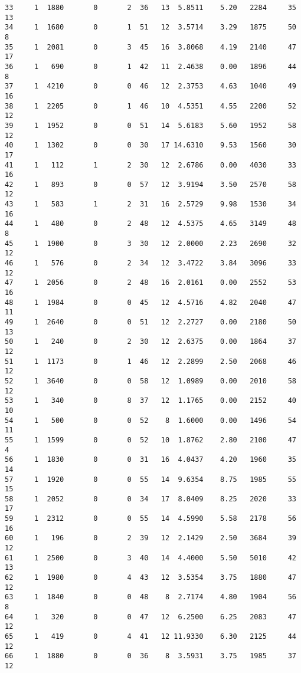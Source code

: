 \documentclass[
  letterpaper,
  DIV=11,
  numbers=noendperiod]{scrreprt}
\begin{document}
\begin{verbatim}
33     1  1880       0       2  36   13  5.8511    5.20   2284     35      13
34     1  1680       0       1  51   12  3.5714    3.29   1875     50       8
35     1  2081       0       3  45   16  3.8068    4.19   2140     47      17
36     1   690       0       1  42   11  2.4638    0.00   1896     44       8
37     1  4210       0       0  46   12  2.3753    4.63   1040     49      16
38     1  2205       0       1  46   10  4.5351    4.55   2200     52      12
39     1  1952       0       0  51   14  5.6183    5.60   1952     58      12
40     1  1302       0       0  30   17 14.6310    9.53   1560     30      17
41     1   112       1       2  30   12  2.6786    0.00   4030     33      16
42     1   893       0       0  57   12  3.9194    3.50   2570     58      12
43     1   583       1       2  31   16  2.5729    9.98   1530     34      16
44     1   480       0       2  48   12  4.5375    4.65   3149     48       8
45     1  1900       0       3  30   12  2.0000    2.23   2690     32      12
46     1   576       0       2  34   12  3.4722    3.84   3096     33      12
47     1  2056       0       2  48   16  2.0161    0.00   2552     53      16
48     1  1984       0       0  45   12  4.5716    4.82   2040     47      11
49     1  2640       0       0  51   12  2.2727    0.00   2180     50      13
50     1   240       0       2  30   12  2.6375    0.00   1864     37      12
51     1  1173       0       1  46   12  2.2899    2.50   2068     46      12
52     1  3640       0       0  58   12  1.0989    0.00   2010     58      12
53     1   340       0       8  37   12  1.1765    0.00   2152     40      10
54     1   500       0       0  52    8  1.6000    0.00   1496     54      11
55     1  1599       0       0  52   10  1.8762    2.80   2100     47       4
56     1  1830       0       0  31   16  4.0437    4.20   1960     35      14
57     1  1920       0       0  55   14  9.6354    8.75   1985     55      15
58     1  2052       0       0  34   17  8.0409    8.25   2020     33      17
59     1  2312       0       0  55   14  4.5990    5.58   2178     56      16
60     1   196       0       2  39   12  2.1429    2.50   3684     39      12
61     1  2500       0       3  40   14  4.4000    5.50   5010     42      13
62     1  1980       0       4  43   12  3.5354    3.75   1880     47      12
63     1  1840       0       0  48    8  2.7174    4.80   1904     56       8
64     1   320       0       0  47   12  6.2500    6.25   2083     47      12
65     1   419       0       4  41   12 11.9330    6.30   2125     44      12
66     1  1880       0       0  36    8  3.5931    3.75   1985     37      12

\end{verbatim}
\end{document}
